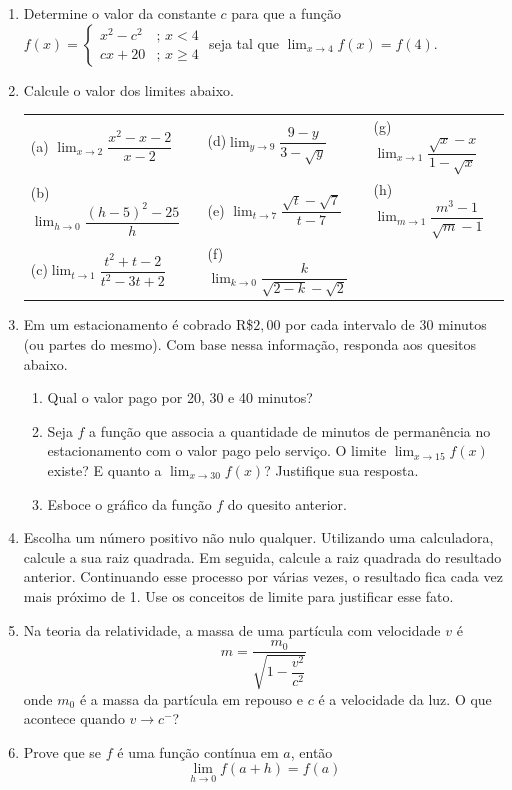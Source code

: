 \documentclass[12pt,a4paper]{article}
\begin{document}
\begin{enumerate}
  \item Determine o valor da constante $c$ para que a função 
    $f(x)=\begin{cases}
      x^{2}-c^{2} & ;\, x < 4\\
      cx+20 & ;\, x \geq 4
    \end{cases}$ seja tal que ${\displaystyle \lim_{x\to4}f(x)=f(4)}$.

  \item Calcule o valor dos limites abaixo.
  
  \begin{tabular}{lll}
    (a) ${\displaystyle \lim_{x\to2}\dfrac{x^{2}-x-2}{x-2}}$ & (d)${\displaystyle \lim_{y\to9}\dfrac{9-y}{3-\sqrt{y}}}$ & (g) ${\displaystyle \lim_{x\to1}\dfrac{\sqrt{x}-x}{1-\sqrt{x}}}$ \\

    (b) ${\displaystyle \lim_{h\to0}\dfrac{(h-5)^{2}-25}{h}}$ & (e) ${\displaystyle \lim_{t\to7}\dfrac{\sqrt{t}-\sqrt{7}}{t-7}}$ &  (h) ${\displaystyle \lim_{m \to 1}\dfrac{m^3 - 1}{\sqrt{m} - 1}}$\\

    (c)${\displaystyle \lim_{t\to1}\dfrac{t^{2}+t-2}{t^{2}-3t+2}}$ & (f) ${\displaystyle \lim_{k\to 0}\dfrac{k}{\sqrt{2-k}-\sqrt{2}}}$ & \\
  \end{tabular}

  \item Em um estacionamento é cobrado R\$$2,00$ por cada intervalo de 30
    minutos (ou partes do mesmo). Com base nessa informação, responda
    aos quesitos abaixo.

    \begin{enumerate}
      \item Qual o valor pago por 20, 30 e 40 minutos?
      \item Seja $f$ a função que associa a quantidade de minutos de permanência
        no estacionamento com o valor pago pelo serviço. O limite ${\displaystyle \lim_{x\to15}f(x)}$
        existe? E quanto a ${\displaystyle \lim_{x\to30}f(x)}$? Justifique sua resposta.
      \item Esboce o gráfico da função $f$ do quesito anterior.
    \end{enumerate}

  \item Escolha um número positivo não nulo qualquer. Utilizando uma calculadora, calcule a sua raiz quadrada.
    Em seguida, calcule a raiz quadrada do resultado anterior. Continuando esse processo por várias vezes, o 
    resultado fica cada vez mais próximo de 1. Use os conceitos de limite para justificar esse fato.

  \item Na teoria da relatividade, a massa de uma partícula com velocidade $v$ é
  $$m = \dfrac{m_0}{\sqrt{1 - \dfrac{v^2}{c^2}}}$$
  onde $m_0$ é a massa da partícula em repouso e $c$ é a velocidade da luz. O
  que acontece quando $v\to c^-$?
  
  \item Prove que se $f$ é uma função contínua em $a$, então 
  $$\lim_{h\to 0} f(a + h) = f(a)$$
  
\end{enumerate}
\end{document}

